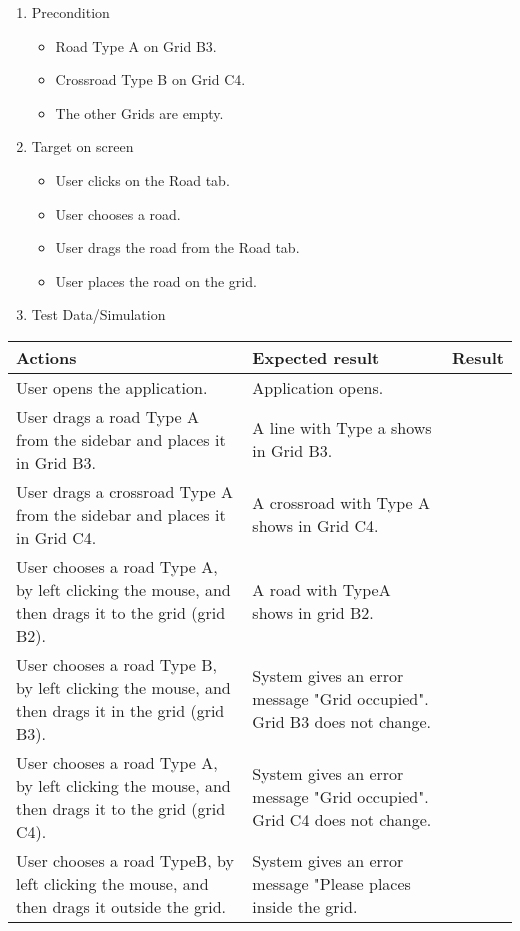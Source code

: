 \begin{enumerate}
		\item Precondition
		\begin{itemize}
			\item Road Type A on Grid B3.
			\item Crossroad Type B on Grid C4.
			\item The other Grids are empty. 
		\end{itemize}
	
	\item Target on screen
	\begin{itemize}
		\item User clicks on the Road tab.
		\item User chooses a road.
		\item User drags the road from the Road tab.
		\item User places the road on the grid.
	\end{itemize}
	\item Test Data/Simulation
\end{enumerate}	
	\begin{tabularx}{\textwidth}{|X|X|p{2.5cm}|}\hline
		Actions & Expected result & Result \\\hline
		User opens the application.& Application opens. &  \pass \\\hline
		User drags a road Type A from the sidebar and places it in Grid B3. & A line with Type a shows in Grid B3. & \pass \\\hline
		User drags a crossroad Type A from the sidebar and places it in Grid C4. & A crossroad with Type A shows in Grid C4. & \pass \\\hline
		User chooses a road Type A, by left clicking the mouse, and then drags it to the grid (grid B2). & A road with TypeA shows in grid B2. & \pass \\\hline
		User chooses a road Type B, by left clicking the mouse, and then drags it in the grid (grid B3). & System gives an  error message "Grid occupied". Grid B3 does not change. & \pass\\\hline
		User chooses a road Type A, by left clicking the mouse, and then drags it to the grid (grid C4). & System gives an  error message "Grid occupied". Grid C4 does not change. & \pass\\\hline
		User chooses a road TypeB, by left clicking the mouse, and then drags it outside the grid. & System gives an error message "Please places inside the grid. & \pass\\\hline
	\end{tabularx}


